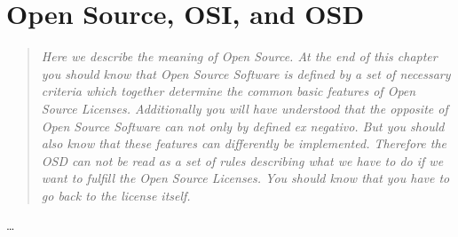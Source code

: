 %
%
%
%
%


\section{Open Source, OSI, and OSD}
\footnotesize
\begin{quote}\itshape
Here we describe the meaning of Open Source. At the end of this chapter you
should know that Open Source Software is defined by a set of necessary criteria
which together determine the common basic features of Open Source Licenses.
Additionally you will have understood that the opposite of Open Source Software
can not only by defined ex negativo. But you should also know that these features
can differently be implemented. Therefore the OSD can not be read as a set of
rules describing what we have to do if we want to fulfill the Open Source
Licenses. You should know that you have to go back to the license itself.
\end{quote}
\normalsize
\ldots

%
